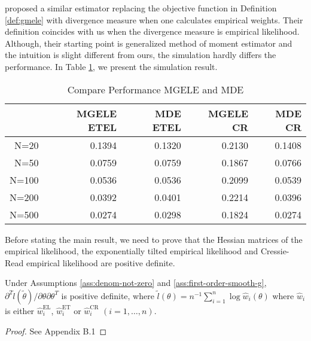 \citet{newey2004higher} proposed a similar estimator replacing the
objective function in Definition \ref{def:gmele} with divergence
measure when one calculates empirical weights. Their definition coincides
with us when the divergence measure is empirical likelihood. Although,
their starting point is generalized method of moment estimator and
the intuition is slight different from ours, the simulation hardly differs
the performance. In Table \ref{tab:mgele-mde}, we present the simulation
result. 
\begin{table}
\centering
\begin{tabular}{rrrrr}
  \hline
 & MGELE ETEL & MDE ETEL & MGELE CR & MDE CR \\ 
  \hline
N=20 & 0.1394 & 0.1320 & 0.2130 & 0.1408 \\
   N=50 & 0.0759 & 0.0759 & 0.1867 & 0.0766 \\
   N=100 & 0.0536 & 0.0536 & 0.2099 & 0.0539 \\
   N=200 & 0.0392 & 0.0401 & 0.2214 & 0.0396 \\
   N=500 & 0.0274 & 0.0298 & 0.1824 & 0.0274 \\
    \hline
\end{tabular}
\caption{\label{tab:mgele-mde}Compare Performance MGELE and MDE}
\end{table}


Before stating the main result, 
we need to prove that the Hessian matrices of the empirical likelihood, the exponentially tilted empirical likelihood and Cressie-Read empirical likelihood are positive definite.

\begin{lem}
\label{lem:pd-sample-var-2}
Under  Assumptions \ref{ass:denom-not-zero} and \ref{ass:first-order-smooth-g},
${\partial^{2}\tilde{l}\left(\tilde{\theta} \right)} / {\partial\theta \partial\theta^T}$ is positive definite,
where $\tilde{l}\left(\theta\right)=n^{-1}\sum_{i=1}^{n}\log\hat{w}_{i}\left(\theta\right)$
where $\hat{w}_{i}$ is either $\hat{w}_{i}^{\mathrm{EL}}$, $\hat{w}_{i}^{\mathrm{ET}}$
or $\hat{w}_{i}^{\mathrm{CR}}$ $\left(i=1,\ldots,n\right)$.
\end{lem}

\begin{proof}
	See Appendix B.1 
\end{proof}



